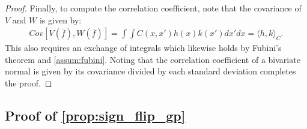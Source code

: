 \begin{proof}
Finally, to compute the correlation coefficient, note that the covariance of $V$ and $W$ is given by:
\begin{align*}
	Cov[ V( \bar f), W(\bar f) ] = \int\int C(x,x') h(x) k(x') dx' dx = \langle h, k \rangle_C.
\end{align*}
This also requires an exchange of integrals which likewise holds by Fubini's theorem and \cref{assum:fubini}. Noting that the correlation coefficient of a bivariate normal is given by its covariance divided by each standard deviation completes the proof.
\end{proof}

\subsection{Proof of \cref{prop:sign_flip_gp}}
\label{app:proof_sign_flip_gp}

